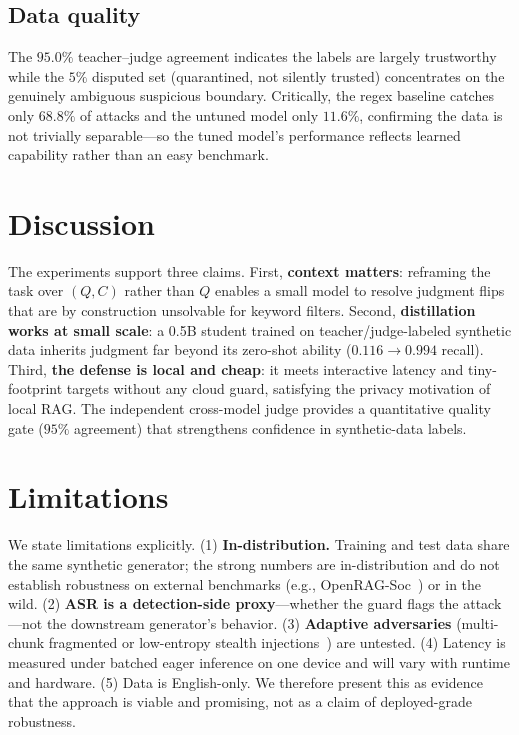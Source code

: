 \documentclass[11pt]{article}
\begin{document}
\subsection{Data quality}
The $95.0\%$ teacher--judge agreement indicates the labels are largely trustworthy
while the $5\%$ disputed set (quarantined, not silently trusted) concentrates on the
genuinely ambiguous \textsf{suspicious} boundary. Critically, the regex baseline
catches only $68.8\%$ of attacks and the untuned model only $11.6\%$, confirming the
data is not trivially separable---so the tuned model's performance reflects learned
capability rather than an easy benchmark.

\section{Discussion}
The experiments support three claims. First, \textbf{context matters}: reframing the
task over $(Q,C)$ rather than $Q$ enables a small model to resolve judgment flips that
are by construction unsolvable for keyword filters. Second, \textbf{distillation works
at small scale}: a 0.5B student trained on teacher/judge-labeled synthetic data
inherits judgment far beyond its zero-shot ability ($0.116\!\rightarrow\!0.994$
recall). Third, \textbf{the defense is local and cheap}: it meets interactive latency
and tiny-footprint targets without any cloud guard, satisfying the privacy motivation
of local RAG. The independent cross-model judge provides a quantitative quality gate
($95\%$ agreement) that strengthens confidence in synthetic-data labels.

\section{Limitations}
We state limitations explicitly. (1) \textbf{In-distribution.} Training and test data
share the same synthetic generator; the strong numbers are in-distribution and do not
establish robustness on external benchmarks (e.g., OpenRAG-Soc~\cite{openragsoc}) or in
the wild. (2) \textbf{ASR is a detection-side proxy}---whether the guard flags the
attack---not the downstream generator's behavior. (3) \textbf{Adaptive adversaries}
(multi-chunk fragmented or low-entropy stealth injections~\cite{agentpoison}) are
untested. (4) Latency is measured under batched eager inference on one device and
will vary with runtime and hardware. (5) Data is English-only. We therefore present
this as evidence that the approach is viable and promising, not as a claim of
deployed-grade robustness.
\end{document}
